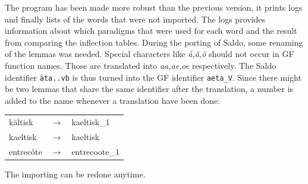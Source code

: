 \documentclass{report}
\begin{document}
The program has been made more robust than the previous version, it prints
logs and finally lists of the words that were not imported. The logs provides
information about which paradigms that were used for each word and the result
from comparing the inflection tables.
During the porting of Saldo, some renaming of the lemmas was needed.
Special characters like \emph{å,ä,ö} should not occur in GF function names.
Those are translated into \emph{aa,ae,oe} respectively. 
The Saldo identifier \verb|äta..vb| is thus turned into the GF identifier \verb|aeta_V|.
Since there might be two lemmas that share the same
identifier after the translation, a number is added to the name whenever a translation
have been done: 
\begin{tabular}{lll}
kältisk & $\rightarrow$ & kaeltisk\_1 \\
kaeltisk & $\rightarrow$ & kaeltisk \\
entrecôte &$\rightarrow$ & entrecoote\_1 \\ 
\end{tabular}



The importing can be redone anytime.
\end{document}
